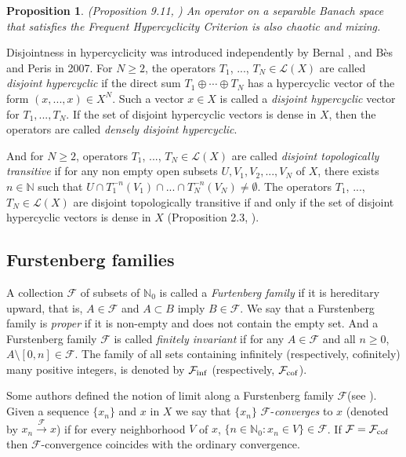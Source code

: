 \documentclass{article}
\newtheorem {proposition}[theorem]{Proposition}
\begin{document}
\begin{proposition} \textnormal{(Proposition 9.11, \cite{GM11})}
An operator on a separable Banach space that satisfies the Frequent Hypercyclicity Criterion is also chaotic and mixing.
\end{proposition}

Disjointness in hypercyclicity was introduced independently by Bernal \cite{B07}, and B\`{e}s and Peris \cite{BP07} in 2007.
For $N\geq 2$, the operators $T_{1}$, ..., $T_{N}\in \mathcal{L}(X)$ are called \textit{disjoint hypercyclic} if the direct sum $T_{1}\oplus \cdots \oplus T_{N}$ has a hypercyclic vector of the form $(x, ..., x)\in X^{N}$. Such a vector $x\in X$ is called a \textit{disjoint hypercyclic} vector for $T_{1}, ..., T_{N}$. If the set of disjoint hypercyclic vectors is dense in $X$, then the operators are called \textit{densely disjoint hypercyclic}.

And for $N\geq 2$, operators $T_{1}$, ..., $T_{N}\in \mathcal{L}(X)$ are called \textit{disjoint topologically transitive} if for any non empty open subsets $U, V_{1}, V_{2}, ..., V_{N}$ of $X$, there exists $n\in \mathbb{N}$ such that $U\cap T^{-n}_{1}(V_{1})\cap...\cap T^{-n}_{N}(V_{N})\neq \emptyset$.
The operators $T_{1}$, ..., $T_{N}\in \mathcal{L}(X)$ are disjoint topologically transitive if and only if the set of disjoint hypercyclic vectors is dense in $X$ (Proposition 2.3, \cite{BP07}).


\subsection{Furstenberg families}

A collection $\mathcal{F}$ of subsets of $\mathbb{N}_{0}$ is called a \textit{Furtenberg family} if it is hereditary upward, that is, $A\in\mathcal{F}$ and $A\subset B$ imply $B\in \mathcal{F}$.
We say that a Furstenberg family is \textit{proper} if it is non-empty and does not contain the empty set.
And a Furstenberg family $\mathcal{F}$ is called \textit{finitely invariant} if for any $A\in\mathcal{F}$ and all $n\geq 0$, $A\setminus [0,n]\in\mathcal{F}$.
The family of all sets containing infinitely (respectively, cofinitely) many positive integers, is denoted by $\mathcal{F}_{\rm inf}$ (respectively, $\mathcal{F}_{\rm cof}$).

Some authors defined the notion of limit along
a Furstenberg family $\mathcal{F}$(see \cite{BMPP19}). Given a sequence $\{ x_{n} \} $ and $x$ in $X$ we say that $\{ x_{n} \} $  ${\mathcal F}$-\textit{converges} to $x$ (denoted by $x_{n} \stackrel{\mathcal F}{\longrightarrow} x$) if for every neighborhood $V$ of $x$, $\{ n\in {\mathbb N}_{0}: x_{n} \in V\} \in {\mathcal F}$. If ${\mathcal F}={\mathcal F}_{{\rm cof}} $ then ${\mathcal F}$-convergence coincides with the ordinary convergence.
\end{document}

